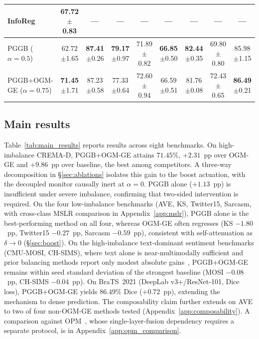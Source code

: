 \documentclass{article}
\begin{document}
\begin{table}[H]
{\begin{tabular}{l cccccccc}
InfoReg               & 67.72{\scriptsize$\pm$0.83} & --- & --- & --- & --- & --- & --- & --- \\
\midrule
PGGB ($\alpha{=}0.5$)     & 62.72{\scriptsize$\pm$1.65} & \textbf{87.41}{\scriptsize$\pm$0.26} & \textbf{79.17}{\scriptsize$\pm$0.97} & 71.89{\scriptsize$\pm$0.82} & \textbf{66.85}{\scriptsize$\pm$0.50} & \textbf{82.44}{\scriptsize$\pm$0.35} & 69.80{\scriptsize$\pm$0.80} & 85.98{\scriptsize$\pm$1.15} \\
PGGB+OGM-GE ($\alpha{=}0.75$) & \textbf{71.45}{\scriptsize$\pm$1.71} & 87.23{\scriptsize$\pm$0.58} & 77.33{\scriptsize$\pm$0.64} & 72.60{\scriptsize$\pm$0.94} & 66.59{\scriptsize$\pm$0.51} & 81.76{\scriptsize$\pm$0.08} & 72.43{\scriptsize$\pm$0.65} & \textbf{86.49}{\scriptsize$\pm$0.21} \\
\bottomrule
\end{tabular}%
}
\end{table}


\subsection{Main results}
\label{sec:main_results}
\vspace{-1em}

Table~\ref{tab:main_results} reports results across eight benchmarks. On high-imbalance CREMA-D, PGGB+OGM-GE attains $71.45\%$, $+2.31$~pp over OGM-GE and $+9.86$~pp over baseline, the best among competitors. A three-way decomposition in \S\ref{sec:ablations} isolates this gain to the boost actuation, with the decoupled monitor causally inert at $\alpha{=}0$. PGGB alone ($+1.13$~pp) is insufficient under severe imbalance, confirming that two-sided intervention is required. On the four low-imbalance benchmarks (AVE, KS, Twitter15, Sarcasm, with cross-class MSLR comparison in Appendix~\ref{app:mslr}), PGGB alone is the best-performing method on all four, whereas OGM-GE often regresses (KS $-1.80$~pp, Twitter15 $-0.27$~pp, Sarcasm $-0.59$~pp), consistent with self-attenuation as $\delta \to 0$ (\S\ref{sec:boost}). On the high-imbalance text-dominant sentiment benchmarks (CMU-MOSI, CH-SIMS), where text alone is near-multimodally sufficient and prior balancing methods report only modest absolute gains~\citep{liu2022chsimsv2,wei2025dgl}, PGGB+OGM-GE remains within seed standard deviation of the strongest baseline (MOSI $-0.08$~pp, CH-SIMS $-0.04$~pp). On BraTS~2021 (DeepLab v3+/ResNet-101, Dice loss), PGGB+OGM-GE yields $86.49\%$ Dice ($+0.72$~pp), extending the mechanism to dense prediction. The composability claim further extends on AVE to two of four non-OGM-GE methods tested (Appendix~\ref{app:composability}). A comparison against OPM~\citep{wei2024opm}, whose single-layer-fusion dependency requires a separate protocol, is in Appendix~\ref{app:opm_comparison}.
\vspace{-1.2em}
\end{document}
